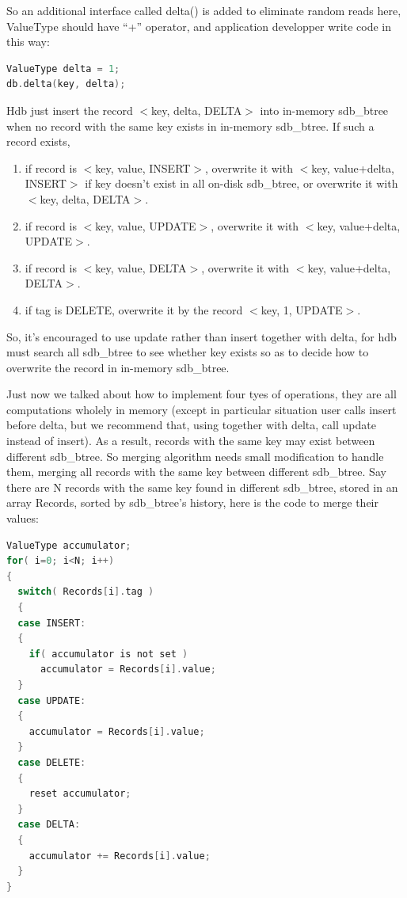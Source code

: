 \documentclass[a4paper,10pt]{article}
\begin{document}
\begin{itemize}
So an additional interface called delta() is added to eliminate random reads here, ValueType should have ``+'' operator, and application developper write code in this way:
\begin{lstlisting}[language=C]
ValueType delta = 1;
db.delta(key, delta);
\end{lstlisting}
Hdb just insert the record $<$key, delta, DELTA$>$ into in-memory sdb\_btree when no record with the same key exists in in-memory sdb\_btree. If such a record exists,
\begin{enumerate}
\item if record is $<$key, value, INSERT$>$, overwrite it with $<$key, value+delta, INSERT$>$ if key doesn't exist in all on-disk sdb\_btree, or overwrite it with $<$key, delta, DELTA$>$.
\item if record is $<$key, value, UPDATE$>$, overwrite it with $<$key, value+delta, UPDATE$>$.
\item if record is $<$key, value, DELTA$>$, overwrite it with $<$key, value+delta, DELTA$>$.
\item if tag is DELETE, overwrite it by the record $<$key, 1, UPDATE$>$.
\end{enumerate}
So, it's encouraged to use update rather than insert together with delta, for hdb must search all sdb\_btree to see whether key exists so as to decide how to overwrite the record in in-memory sdb\_btree.

\end{itemize}

Just now we talked about how to implement four tyes of operations, they are all computations wholely in memory
(except in particular situation user calls insert before delta, but we recommend that, using together with delta, call update instead of insert).
As a result, records with the same key may exist between different sdb\_btree. So merging algorithm needs small modification to handle them, merging all records with the same key between different sdb\_btree.
Say there are N records with the same key found in different sdb\_btree, stored in an array Records, sorted by sdb\_btree's history, here is the code to merge their values:
\begin{lstlisting}[language=C]
ValueType accumulator;
for( i=0; i<N; i++)
{
  switch( Records[i].tag )
  {
  case INSERT:
  {
    if( accumulator is not set )
      accumulator = Records[i].value;
  }
  case UPDATE:
  {
    accumulator = Records[i].value;
  }
  case DELETE:
  {
    reset accumulator;
  }
  case DELTA:
  {
    accumulator += Records[i].value;
  }
}
\end{lstlisting}
\end{document}
